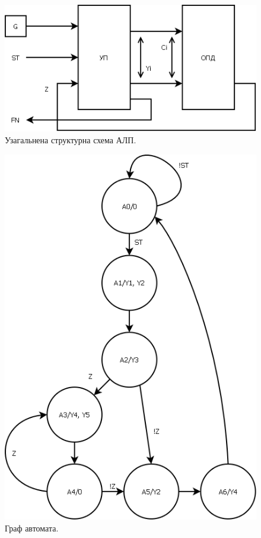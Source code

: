 \documentclass[a4paper, 10pt]{article}
\begin{document}
\begin{figure}[H]
\begin{center}
\includegraphics[scale=0.5]{general.png}
\caption{Узагальнена структурна схема АЛП.}
\end{center}
\end{figure}

\begin{figure}[H]
\begin{center}
\includegraphics[scale=0.5]{states.png}
\caption{Граф автомата.}
\end{center}
\end{figure}
\end{document}
